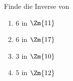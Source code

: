 \begin{aufgabe}
Finde die Inverse von
\begin{enumerate}[label=\alph*)]
\item $6$ in $\Zm{11}$
\item $6$ in $\Zm{17}$
\item $3$ in $\Zm{10}$
\item $5$ in $\Zm{12}$
\end{enumerate}
\end{aufgabe}
